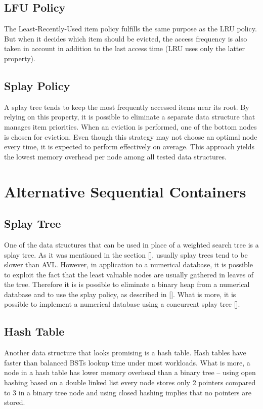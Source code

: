 \subsection{LFU Policy}
The Least-Recently-Used item policy fulfills the same purpose as the LRU policy. But when it decides which item should be evicted, the access frequency is also taken in account in addition to the last access time (LRU uses only the latter property).

\subsection{Splay Policy}
A splay tree tends to keep the most frequently accessed items near its root. By relying on this property, it is possible to eliminate a separate data structure that manages item priorities. When an eviction is performed, one of the bottom nodes is chosen for eviction. Even though this strategy may not choose an optimal node every time, it is expected to perform effectively on average. This approach yields the lowest memory overhead per node among all tested data structures.


\section{Alternative Sequential Containers}

\subsection{Splay Tree}
One of the data structures that can be used in place of a weighted search tree is a splay tree. As it was mentioned in the section [], usually splay trees tend to be slower than AVL. However, in application to a numerical database, it is possible to exploit the fact that the least valuable nodes are usually gathered in leaves of the tree. Therefore it is is possible to eliminate a binary heap from a numerical database and to use the splay policy, as described in []. What is more, it is possible to implement a numerical database using a concurrent splay tree [].

\subsection{Hash Table}
Another data structure that looks promising is a hash table. Hash tables have faster than balanced BSTs lookup time under most workloads. What is more, a node in a hash table has lower memory overhead than a binary tree – using open hashing based on a double linked list every node stores only 2 pointers compared to 3 in a binary tree node and using closed hashing implies that no pointers are stored.

